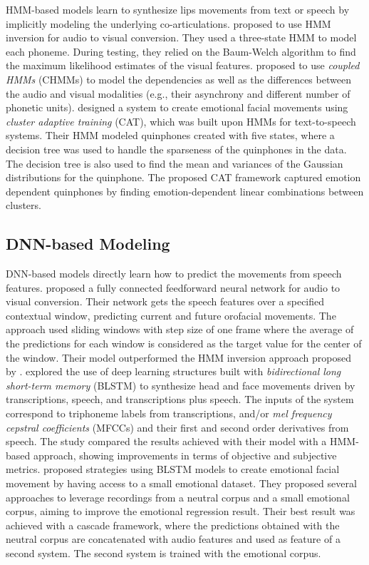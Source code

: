 \documentclass[10pt,journal,compsoc]{IEEEtran}
\begin{document}
	HMM-based models learn to synthesize lips movements from text or speech by implicitly modeling the underlying co-articulations. \citet{Choi_2001} proposed to use HMM inversion for audio to visual conversion. They used a three-state HMM to model each phoneme. During testing, they relied on the Baum-Welch algorithm to find the maximum likelihood estimates of the visual features. \citet{Xie_2007_2} proposed to use \emph{coupled HMMs} (CHMMs) to model the dependencies as well as the differences between the audio and visual modalities (e.g., their asynchrony and different number of phonetic units). \citet{Anderson_2013} designed a system to create emotional facial movements using \emph{cluster adaptive training} (CAT), which was built upon HMMs for text-to-speech systems. Their HMM modeled quinphones created with five states, where a decision tree was used to handle the sparseness of the quinphones in the data. The decision tree is also used to find the mean and variances of the Gaussian distributions for the quinphone. The proposed CAT framework captured emotion dependent quinphones by finding emotion-dependent linear combinations between clusters. 



\subsection{DNN-based Modeling}
\label{ssec:dis}
	
	
DNN-based models directly learn how to predict the movements from speech features. \citet{Taylor_2016} proposed a fully connected feedforward neural network for audio to visual conversion. Their network gets the speech features over a specified contextual window, predicting current and future orofacial movements. The approach used sliding windows with step size of one frame where the average of the predictions for each window is considered as the target value for the center of the window. Their model outperformed the HMM inversion approach proposed by \citet{Choi_2001}. \citet{Fan_2016} explored the use of deep learning structures built with \emph{bidirectional long short-term memory} (BLSTM) to synthesize head and face movements driven by transcriptions, speech, and transcriptions plus speech. The inputs of the system correspond to triphoneme labels from transcriptions, and/or \emph{mel frequency cepstral coefficients} (MFCCs) and their first and second order derivatives from speech. The study compared the results achieved with their model with a HMM-based approach, showing improvements in terms of objective and subjective metrics.  \citet{Li_2016_2} proposed strategies using BLSTM models to create emotional facial movement by having access to a small emotional dataset. They proposed several approaches to leverage recordings from a neutral corpus and a small emotional corpus, aiming to improve the emotional regression result. Their best result was achieved with a cascade framework, where the predictions obtained with the neutral corpus are concatenated with audio features and used as feature of a second system. The second system is trained with the emotional corpus.
\end{document}
